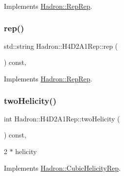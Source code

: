 Implements \mbox{\hyperlink{structHadron_1_1RepRep_ab3213025f6de249f7095892109575fde}{Hadron\+::\+Rep\+Rep}}.

\mbox{\label{structHadron_1_1H4D2A1Rep_ad4b2ccfecdb8297fd88eaa27c9d1262e}} 
\subsubsection{\texorpdfstring{rep()}{rep()}\hspace{0.1cm}{\footnotesize\ttfamily [5/5]}}
{\footnotesize\ttfamily std\+::string Hadron\+::\+H4\+D2\+A1\+Rep\+::rep (\begin{DoxyParamCaption}{ }\end{DoxyParamCaption}) const\hspace{0.3cm}{\ttfamily [inline]}, {\ttfamily [virtual]}}



Implements \mbox{\hyperlink{structHadron_1_1RepRep_ab3213025f6de249f7095892109575fde}{Hadron\+::\+Rep\+Rep}}.

\mbox{\label{structHadron_1_1H4D2A1Rep_ade522129ee7018a431237c9d04e13351}} 
\subsubsection{\texorpdfstring{twoHelicity()}{twoHelicity()}\hspace{0.1cm}{\footnotesize\ttfamily [1/3]}}
{\footnotesize\ttfamily int Hadron\+::\+H4\+D2\+A1\+Rep\+::two\+Helicity (\begin{DoxyParamCaption}{ }\end{DoxyParamCaption}) const\hspace{0.3cm}{\ttfamily [inline]}, {\ttfamily [virtual]}}

2 $\ast$ helicity 

Implements \mbox{\hyperlink{structHadron_1_1CubicHelicityRep_af507aa56fc2747eacc8cb6c96db31ecc}{Hadron\+::\+Cubic\+Helicity\+Rep}}.

\mbox{\label{structHadron_1_1H4D2A1Rep_ade522129ee7018a431237c9d04e13351}} 
